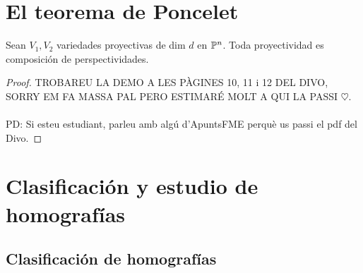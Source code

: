 \section{El teorema de Poncelet}

\begin{teo}[de Poncelet]
	Sean $V_1, V_2$ variedades proyectivas de dim $d$ en $\mathbb{P}^n$. Toda proyectividad es composición de perspectividades.
\end{teo}
\begin{proof} %
	TROBAREU LA DEMO A LES PÀGINES 10, 11 i 12 DEL DIVO, SORRY EM FA MASSA PAL PERO ESTIMARÉ MOLT A QUI LA PASSI $\heartsuit$. \\ \\
	PD: Si esteu estudiant, parleu amb algú d'ApuntsFME perquè us passi el pdf del Divo.
\end{proof}

\section{Clasificación y estudio de homografías}

\subsection{Clasificación de homografías}

